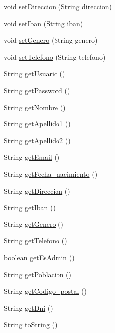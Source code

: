 \begin{DoxyCompactItemize}
\item 
void \mbox{\hyperlink{classobjetos_1_1_usuario_a617d6485d3c99725d35a7f37093a72cf}{set\+Direccion}} (String direccion)
\item 
void \mbox{\hyperlink{classobjetos_1_1_usuario_a1dd10cd5dfebcd7cf424a877839c1079}{set\+Iban}} (String iban)
\item 
void \mbox{\hyperlink{classobjetos_1_1_usuario_ac9905e666ce288e519fc087e23d25854}{set\+Genero}} (String genero)
\item 
void \mbox{\hyperlink{classobjetos_1_1_usuario_a0ff938bea2a54afe1c1692e8944010e7}{set\+Telefono}} (String telefono)
\item 
String \mbox{\hyperlink{classobjetos_1_1_usuario_a091d44abe53530995ec78cde4c574a1d}{get\+Usuario}} ()
\item 
String \mbox{\hyperlink{classobjetos_1_1_usuario_a78a59647b3bfd56744741973ff9521ff}{get\+Password}} ()
\item 
String \mbox{\hyperlink{classobjetos_1_1_usuario_a055ad022318e4a768f4586d7a114653d}{get\+Nombre}} ()
\item 
String \mbox{\hyperlink{classobjetos_1_1_usuario_ae9882e1900abade7ade510479c9f8383}{get\+Apellido1}} ()
\item 
String \mbox{\hyperlink{classobjetos_1_1_usuario_a1d3064bdecaadd7ff0487f0715780ee5}{get\+Apellido2}} ()
\item 
String \mbox{\hyperlink{classobjetos_1_1_usuario_a504d7bcb1c63297b870f8499b88381d1}{get\+Email}} ()
\item 
String \mbox{\hyperlink{classobjetos_1_1_usuario_a175efa1135100c4750a19be789391307}{get\+Fecha\+\_\+nacimiento}} ()
\item 
String \mbox{\hyperlink{classobjetos_1_1_usuario_a3e13dfa01d027561e7866f4cd1c2e3c5}{get\+Direccion}} ()
\item 
String \mbox{\hyperlink{classobjetos_1_1_usuario_ab66729eaad2e417c447f8b86bb56c986}{get\+Iban}} ()
\item 
String \mbox{\hyperlink{classobjetos_1_1_usuario_ad91ec5ebca29f02270f825af722dd285}{get\+Genero}} ()
\item 
String \mbox{\hyperlink{classobjetos_1_1_usuario_a61da31ecd6448c2064a7dcd276d71754}{get\+Telefono}} ()
\item 
boolean \mbox{\hyperlink{classobjetos_1_1_usuario_a110d1f830d1c6041f1ee78c5bd32395d}{get\+Es\+Admin}} ()
\item 
String \mbox{\hyperlink{classobjetos_1_1_usuario_ac5bbdb911746e90bb9d0be80195eb425}{get\+Poblacion}} ()
\item 
String \mbox{\hyperlink{classobjetos_1_1_usuario_a7e8a422150526d3436159d63817c225d}{get\+Codigo\+\_\+postal}} ()
\item 
String \mbox{\hyperlink{classobjetos_1_1_usuario_a35aa11d09cd9caa12bb4e2445fe36c1f}{get\+Dni}} ()
\item 
String \mbox{\hyperlink{classobjetos_1_1_usuario_a60bfdc7b6f95b380ed50723c1e9b1cc6}{to\+String}} ()
\end{DoxyCompactItemize}


